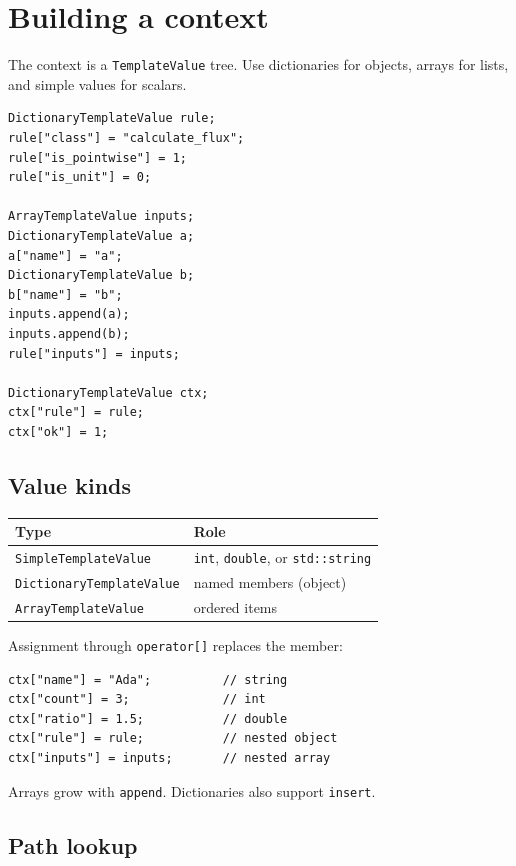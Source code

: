 \documentclass[11pt,letterpaper]{article}
\newcommand{\api}[1]{\texttt{#1}}
\begin{document}
\section{Building a context}

The context is a \api{TemplateValue} tree. Use dictionaries for objects,
arrays for lists, and simple values for scalars.

\begin{lstlisting}
DictionaryTemplateValue rule;
rule["class"] = "calculate_flux";
rule["is_pointwise"] = 1;
rule["is_unit"] = 0;

ArrayTemplateValue inputs;
DictionaryTemplateValue a;
a["name"] = "a";
DictionaryTemplateValue b;
b["name"] = "b";
inputs.append(a);
inputs.append(b);
rule["inputs"] = inputs;

DictionaryTemplateValue ctx;
ctx["rule"] = rule;
ctx["ok"] = 1;
\end{lstlisting}

\subsection{Value kinds}

\begin{center}
\begin{tabular}{ll}
\toprule
Type & Role \\
\midrule
\api{SimpleTemplateValue} & \texttt{int}, \texttt{double}, or \texttt{std::string} \\
\api{DictionaryTemplateValue} & named members (object) \\
\api{ArrayTemplateValue} & ordered items \\
\bottomrule
\end{tabular}
\end{center}

Assignment through \texttt{operator[]} replaces the member:

\begin{lstlisting}
ctx["name"] = "Ada";          // string
ctx["count"] = 3;             // int
ctx["ratio"] = 1.5;           // double
ctx["rule"] = rule;           // nested object
ctx["inputs"] = inputs;       // nested array
\end{lstlisting}

Arrays grow with \api{append}. Dictionaries also support \api{insert}.

\subsection{Path lookup}
\end{document}
